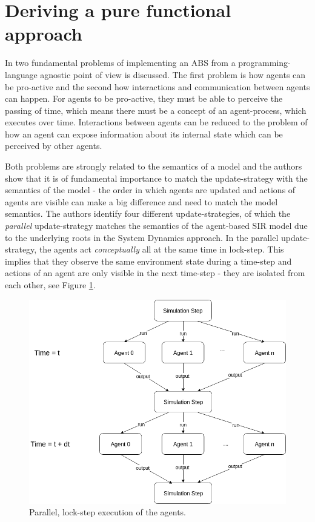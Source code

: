 \section{Deriving a pure functional approach}
\label{sec:functional_approach}

In \cite{thaler_art_2017} two fundamental problems of implementing an ABS from a programming-language agnostic point of view is discussed. The first problem is how agents can be pro-active and the second how interactions and communication between agents can happen. For agents to be pro-active, they must be able to perceive the passing of time, which means there must be a concept of an agent-process, which executes over time. Interactions between agents can be reduced to the problem of how an agent can expose information about its internal state which can be perceived by other agents. 

Both problems are strongly related to the semantics of a model and the authors show that it is of fundamental importance to match the update-strategy with the semantics of the model - the order in which agents are updated and actions of agents are visible can make a big difference and need to match the model semantics. The authors identify four different update-strategies, of which the \textit{parallel} update-strategy matches the semantics of the agent-based SIR model due to the underlying roots in the System Dynamics approach. In the parallel update-strategy, the agents act \textit{conceptually} all at the same time in lock-step. This implies that they observe the same environment state during a time-step and actions of an agent are only visible in the next time-step - they are isolated from each other, see Figure \ref{fig:parallel_strategy}.

\begin{figure}
	\centering
	\includegraphics[width=.4\textwidth, angle=0]{./fig/diagrams/parallel_strategy.png}
	\caption{Parallel, lock-step execution of the agents.}
	\label{fig:parallel_strategy}
\end{figure}


